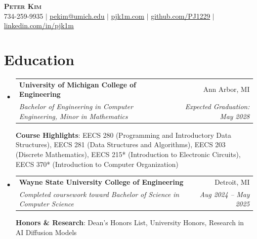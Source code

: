 \documentclass[letterpaper,11pt]{article}
\makeatletter
\newcommand{\resumeSubheading}[4]{
  \vspace{-2pt}\item
    \begin{tabular*}{0.97\textwidth}[t]{l@{\extracolsep{\fill}}r}
      \textbf{#1} & #2 \\
      \textit{\small#3} & \textit{\small #4} \\
    \end{tabular*}\vspace{-7pt}
}
\newcommand{\resumeSubHeadingListStart}{\begin{itemize}[leftmargin=0.15in, label={}]}
\newcommand{\resumeSubHeadingListEnd}{\end{itemize}}
\makeatother
\begin{document}

\begin{center}
    \textbf{\Huge \scshape Peter Kim} \\ \vspace{1pt}
    \small 734-259-9935 $|$ \href{mailto:pekim@umich.edu}{\underline{pekim@umich.edu}} $|$ 
    \href{https://pjk1m.com/}{\underline{pjk1m.com}} $|$
    \href{https://github.com/PJ1229}{\underline{github.com/PJ1229}} $|$
    \href{https://linkedin.com/in/pjk1m/}{\underline{linkedin.com/in/pjk1m}}
\end{center}


\section{Education}
  \resumeSubHeadingListStart
    \resumeSubheading
      {University of Michigan College of Engineering}{Ann Arbor, MI}
      {Bachelor of Engineering in Computer Engineering, Minor in Mathematics}{Expected Graduation: May 2028}

      \vspace{3pt}

      {\small \textbf{Course Highlights}: EECS 280 (Programming and Introductory Data Structures), EECS 281 (Data Structures and Algorithms), EECS 203 (Discrete Mathematics), EECS 215* (Introduction to Electronic Circuits), EECS 370* (Introduction to Computer Organization)\par}
      \vspace{-1pt}
    \resumeSubheading
      {Wayne State University College of Engineering}{Detroit, MI}
      {Completed coursework toward Bachelor of Science in Computer Science}{Aug 2024 -- May 2025}

      \vspace{3pt}

      {\small \textbf{Honors \& Research}: Dean's Honors List, University Honors, Research in AI Diffusion Models\par}
      \vspace{-1pt}
  \resumeSubHeadingListEnd
\end{document}
